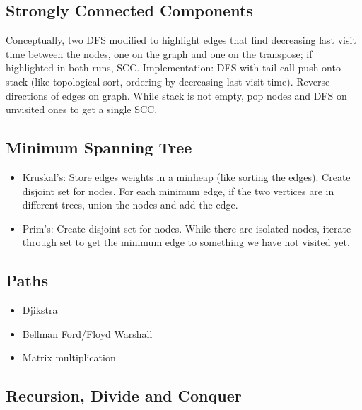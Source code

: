 \documentclass[10pt]{article}
\begin{document}
\subsection{Strongly Connected Components}
Conceptually, two DFS modified to highlight edges that find decreasing last visit time between the nodes, one on the graph and one on the transpose; if highlighted in both runs, SCC. Implementation: DFS with tail call push onto stack (like topological sort, ordering by decreasing last visit time). Reverse directions of edges on graph. While stack is not empty, pop nodes and DFS on unvisited ones to get a single SCC. 
\subsection{Minimum Spanning Tree}
\begin{itemize}
    \item Kruskal's: Store edges weights in a minheap (like sorting the edges). Create disjoint set for nodes. For each minimum edge, if the two vertices are in different trees, union the nodes and add the edge.
    \item Prim's: Create disjoint set for nodes. While there are isolated nodes, iterate through set to get the minimum edge to something we have not visited yet.
\end{itemize}
\subsection{Paths}
\begin{itemize}
    \item Djikstra
    \item Bellman Ford/Floyd Warshall
    \item Matrix multiplication
\end{itemize}


\subsection{Recursion, Divide and Conquer}
\end{document}

